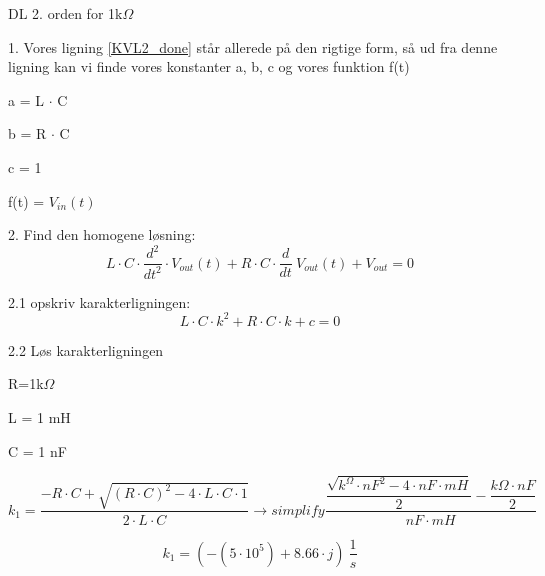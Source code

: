 DL 2. orden for 1k$\Omega$

1. Vores ligning \ref{KVL2_done} står allerede på den rigtige form, så ud fra denne ligning kan vi finde vores konstanter a, b, c og vores funktion f(t)

\begin{center}
\begin{minipage}{.2\linewidth}
a = L $\cdot$ C
\end{minipage}
\begin{minipage}{.2\linewidth}
b = R $\cdot$ C
\end{minipage}
\begin{minipage}{.2\linewidth}
c = 1
\end{minipage}
\begin{minipage}{.2\linewidth}
f(t) = $V_{in}(t)$
\end{minipage}
\end{center}

2. Find den homogene løsning: 
\begin{equation}
	L\cdot C\cdot \dfrac{d^{2}}{dt^{2}}\cdot V_{out}  \left(t\right) +R\cdot C\cdot \dfrac{d}{dt}\ V_{out}  \left(t\right) +V_{out} = 0
\end{equation}

2.1 opskriv karakterligningen:
\begin{equation}
	L\cdot C\cdot k^{2}+R\cdot C\cdot k+c = 0
\end{equation}

2.2 Løs karakterligningen

\begin{center}
\begin{minipage}{.2\linewidth}
R=1k$\Omega$
\end{minipage}
\begin{minipage}{.2\linewidth}
L = 1 mH
\end{minipage}
\begin{minipage}{.2\linewidth}
C = 1 nF
\end{minipage}
\end{center}

\begin{equation}
	k_{1} = \dfrac{ -R\cdot C+ \sqrt{ \left(R\cdot C\right) ^{2}-4\cdot L\cdot C\cdot 1} }{2\cdot L\cdot C}\rightarrow{simplify} 
	\dfrac{\dfrac{ \sqrt{k^{\Omega}\cdot nF^{2}-4\cdot nF\cdot mH} }{2}-\dfrac{k \Omega\cdot nF}{2}}{nF\cdot mH}
\end{equation}

\begin{equation}
	k_{1} =  \left( - \left(5\cdot 10^{5}\right) +8.66\cdot j\right) \ \dfrac{1}{s}
\end{equation}

